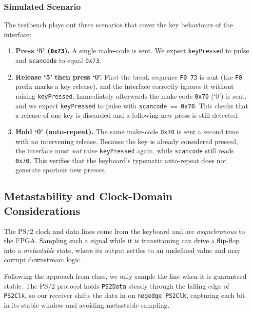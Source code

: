 \documentclass[11pt,a4paper]{article}
\begin{document}
\vspace{0.5cm}
\subsubsection*{Simulated Scenario}

The testbench plays out three scenarios that cover the key behaviours of the
interface:

\begin{enumerate}
    \item \textbf{Press `5' (\texttt{0x73}).}
    A single make-code is sent. We expect \texttt{keyPressed} to pulse and
    \texttt{scancode} to equal \texttt{0x73}.

    \item \textbf{Release `5' then press `0'.}
    First the break sequence \texttt{F0 73} is sent (the \texttt{F0} prefix
    marks a key release), and the interface correctly ignores it without
    raising \texttt{keyPressed}. Immediately afterwards the make-code
    \texttt{0x70} (`0') is sent, and we expect \texttt{keyPressed} to pulse
    with \texttt{scancode == 0x70}. This checks that a release of one key is
    discarded and a following new press is still detected.

    \item \textbf{Hold `0' (auto-repeat).}
    The same make-code \texttt{0x70} is sent a second time with no
    intervening release. Because the key is already considered pressed, the
    interface must \emph{not} raise \texttt{keyPressed} again, while
    \texttt{scancode} still reads \texttt{0x70}. This verifies that the
    keyboard's typematic auto-repeat does not generate spurious new presses.
\end{enumerate}


\vspace{1cm}
\subsection{Metastability and Clock-Domain Considerations}

The PS/2 clock and data lines come from the keyboard and are
\emph{asynchronous} to the FPGA. Sampling such a signal while it is
transitioning can drive a flip-flop into a \emph{metastable} state, where its
output settles to an undefined value and may corrupt downstream logic.

Following the approach from class, we only sample the line when it is
guaranteed stable. The PS/2 protocol holds \texttt{PS2Data} steady through the
falling edge of \texttt{PS2Clk}, so our receiver shifts the data in on
\texttt{negedge PS2Clk}, capturing each bit in its stable window and avoiding
metastable sampling.
\end{document}
